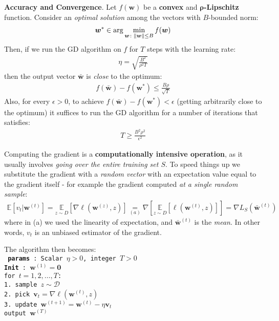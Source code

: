 \documentclass[../template.tex]{subfiles}
\begin{document}
\textbf{Accuracy and Convergence}. Let $f(\bm{w})$ be a \textbf{convex} and $\bm{\rho}$\textbf{-Lipschitz} function. Consider an \textit{optimal solution} among the vectors with $B$-bounded norm:
\begin{align*}
    \bm{w}^* \in \arg\min_{\bm{w}\colon \norm{\bm{w}} \leq B} f(\bm{w})
\end{align*}   
Then, if we run the GD algorithm on $f$ for $T$ steps with the learning rate:
\begin{align*}
    \eta = \sqrt{\frac{B^2}{\rho^2 T} }
\end{align*}  
then the output vector $ \bar{\bm{w}}$  is \textit{close} to the optimum:
\begin{align*}
    f(\bm{\bar{w}}) - f(\bm{w}^*) \leq \frac{B \rho}{\sqrt{T}} 
\end{align*} 
Also, for every $\epsilon > 0$, to achieve $f(\bar{\bm{w}}) - f(\bm{w}^*) < \epsilon$ (getting arbitrarily close to the optimum) it suffices to run the GD algorithm for a number of iterations that satisfies:
\begin{align*}
    T \geq \frac{B^2 \rho^2}{\epsilon^2} 
\end{align*}

Computing the gradient is a \textbf{computationally intensive operation}, as it usually involves \textit{going over the entire training set $S$}. To speed things up we substitute the gradient with a \textit{random vector} with an expectation value equal to the gradient itself - for example the gradient computed \textit{at a single random sample}:
\begin{align*}
    \mathbb{E}\left[v_t|\bm{w}^{(t)}\right] = \underset{z \sim D}{\mathbb{E}} [ \nabla \ell (\bm{w}^{(z)}, z)] \underset{(a)}{=} \nabla \left[\underset{z \sim D}{\mathbb{E}}[\ell(\bm{w}^{(t)},z)] \right] = \nabla L_S(\bar{\bm{w}}^{(t)}) 
\end{align*}  
where in (a) we used the linearity of expectation, and $\bar{\bm{w}}^{(t)}$ is the \textit{mean}. In other words, $v_t$ is an unbiased estimator of the gradient. 

The algorithm then becomes:\\
\texttt{
    \textbf{params} : Scalar $\eta > 0$, integer $T > 0$\\
    \textbf{Init} : $\bm{w}^{(1)} = \bm{0}$\\
    for $t = 1,2,\dots, T$:\\
    1. sample $z \sim \mathcal{D}$\\
    2. pick $\bm{v}_t = \nabla\ell(\bm{w}^{(t)}, z)$\\
    3. update $\bm{w}^{(t+1)} = \bm{w}^{(t)} - \eta \bm{v}_t$\\
    output $\bm{w}^{(T)}$       
}
\end{document}
